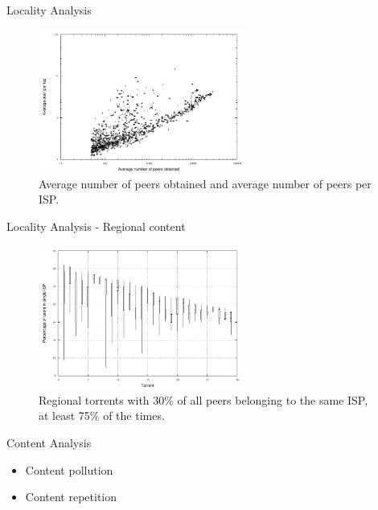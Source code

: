 \documentclass{beamer}
\begin{document}
\begin{frame}{Locality Analysis}

\begin{figure}[h]
\center
\includegraphics[height=1.85in]{Figures/ispPeers_AVGPerPeers}
\caption{Average number of peers obtained and average number of peers per ISP.}
\label{fig:torrent_avg_isp} 
\end{figure}

\end{frame}



\begin{frame}{Locality Analysis - Regional content}

\begin{figure}[h]
\center
\includegraphics[height=1.85in]{Figures/ispPeers_candlestick_above30}
\caption{Regional torrents with 30\% of all peers belonging to the same ISP, at least 75\% of the times.}
\label{fig:torrent_avg_isp} 
\end{figure}

\end{frame}


\begin{frame}{Content Analysis}

\begin{itemize}
\addtolength{\itemsep}{1\baselineskip}
\item
    Content pollution
\item
    Content repetition

\end{itemize}
\end{frame}
\end{document}
